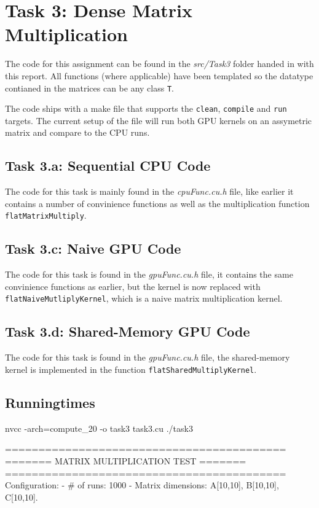 \section{Task 3: Dense Matrix Multiplication}
The code for this assignment can be found in the \textit{src/Task3} folder
handed in with this report. All functions (where applicable) have been templated
so the datatype contianed in the matrices can be any class \texttt{T}.

The code ships with a make file that supports the \texttt{clean},
\texttt{compile} and \texttt{run} targets. The current setup of the file will
run both GPU kernels on an assymetric matrix and compare to the CPU runs.

\subsection{Task 3.a: Sequential CPU Code}
The code for this task is mainly found in the \textit{cpuFunc.cu.h} file, like
earlier it contains a number of convinience functions as well as the
multiplication function \texttt{flatMatrixMultiply}.

\subsection{Task 3.c: Naive GPU Code}
The code for this task is found in the \textit{gpuFunc.cu.h} file, it contains
the same convinience functions as earlier, but the kernel is now replaced with
\texttt{flatNaiveMutliplyKernel}, which is a naive matrix multiplication kernel.

\subsection{Task 3.d: Shared-Memory GPU Code}
The code for this task is found in the \textit{gpuFunc.cu.h} file, the
shared-memory kernel is implemented in the function
\texttt{flatSharedMultiplyKernel}.

\subsection{Runningtimes}


nvcc -arch=compute_20 -o task3 task3.cu
./task3

==========================================
======= MATRIX MULTIPLICATION TEST =======
==========================================
Configuration:
 - # of runs: 1000
 - Matrix dimensions: A[10,10], B[10,10], C[10,10].

